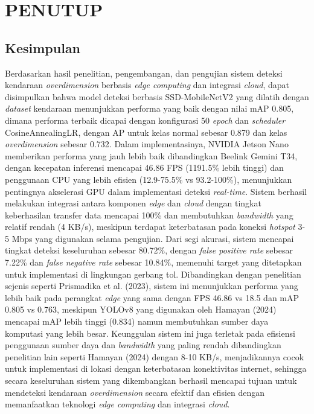 \chapter{PENUTUP}
\label{chap:penutup}


\section{Kesimpulan}
\label{sec:kesimpulan}
Berdasarkan hasil penelitian, pengembangan, dan pengujian sistem deteksi kendaraan \emph{overdimension} berbasis \emph{edge computing} dan integrasi \emph{cloud}, dapat disimpulkan bahwa model deteksi berbasis SSD-MobileNetV2 yang dilatih dengan \emph{dataset} kendaraan menunjukkan performa yang baik dengan nilai mAP 0.805, dimana performa terbaik dicapai dengan konfigurasi 50 \emph{epoch} dan \emph{scheduler} CosineAnnealingLR, dengan AP untuk kelas normal sebesar 0.879 dan kelas \emph{overdimension} sebesar 0.732. Dalam implementasinya, NVIDIA Jetson Nano memberikan performa yang jauh lebih baik dibandingkan Beelink Gemini T34, dengan kecepatan inferensi mencapai 46.86 FPS (1191.5\% lebih tinggi) dan penggunaan CPU yang lebih efisien (12.9-75.5\% vs 93.2-100\%), menunjukkan pentingnya akselerasi GPU dalam implementasi deteksi \emph{real-time}. Sistem berhasil melakukan integrasi antara komponen \emph{edge} dan \emph{cloud} dengan tingkat keberhasilan transfer data mencapai 100\% dan membutuhkan \emph{bandwidth} yang relatif rendah (4 KB/s), meskipun terdapat keterbatasan pada koneksi \emph{hotspot} 3-5 Mbps yang digunakan selama pengujian. Dari segi akurasi, sistem mencapai tingkat deteksi keseluruhan sebesar 80.72\%, dengan \emph{false positive rate} sebesar 7.22\% dan \emph{false negative rate} sebesar 10.84\%, memenuhi target yang ditetapkan untuk implementasi di lingkungan gerbang tol. Dibandingkan dengan penelitian sejenis seperti Prismadika et al. (2023), sistem ini menunjukkan performa yang lebih baik pada perangkat \emph{edge} yang sama dengan FPS 46.86 vs 18.5 dan mAP 0.805 vs 0.763, meskipun YOLOv8 yang digunakan oleh Hamayan (2024) mencapai mAP lebih tinggi (0.834) namun membutuhkan sumber daya komputasi yang lebih besar. Keunggulan sistem ini juga terletak pada efisiensi penggunaan sumber daya dan \emph{bandwidth} yang paling rendah dibandingkan penelitian lain seperti Hamayan (2024) dengan 8-10 KB/s, menjadikannya cocok untuk implementasi di lokasi dengan keterbatasan konektivitas internet, sehingga secara keseluruhan sistem yang dikembangkan berhasil mencapai tujuan untuk mendeteksi kendaraan \emph{overdimension} secara efektif dan efisien dengan memanfaatkan teknologi \emph{edge computing} dan integrasi \emph{cloud}.


